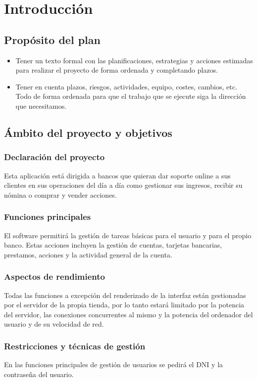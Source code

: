 \section{Introducción}
\subsection{Propósito del plan}
\begin{itemize}
	\item Tener un texto formal con las planificaciones, estrategias y acciones estimadas para realizar el proyecto de forma ordenada y completando plazos.
	\item Tener en cuenta plazos, riesgos, actividades, equipo, costes, cambios, etc. Todo de forma ordenada para que el trabajo que se ejecute siga la dirección que necesitamos.
\end{itemize}

\subsection{Ámbito del proyecto y objetivos}
\subsubsection{Declaración del proyecto}
Esta aplicación está dirigida a bancos que quieran dar soporte online a sus clientes en sus operaciones del día a día como gestionar sus ingresos, recibir su nómina o comprar y vender acciones.
\subsubsection{Funciones principales}
El software permitirá la gestión de tareas básicas para el usuario y para el propio banco. Estas acciones incluyen la gestión de cuentas, tarjetas bancarias, prestamos, acciones y la actividad general de la cuenta.
\subsubsection{Aspectos de rendimiento}
Todas las funciones a excepción del renderizado de la interfaz están gestionadas por el servidor de la propia tienda, por lo tanto estará limitado por la potencia del servidor, las conexiones concurrentes al mismo y la potencia del ordenador del usuario y de su velocidad de red.
\subsubsection{Restricciones y técnicas de gestión}
En las funciones principales de gestión de usuarios se pedirá el DNI y la contraseña del usuario.

